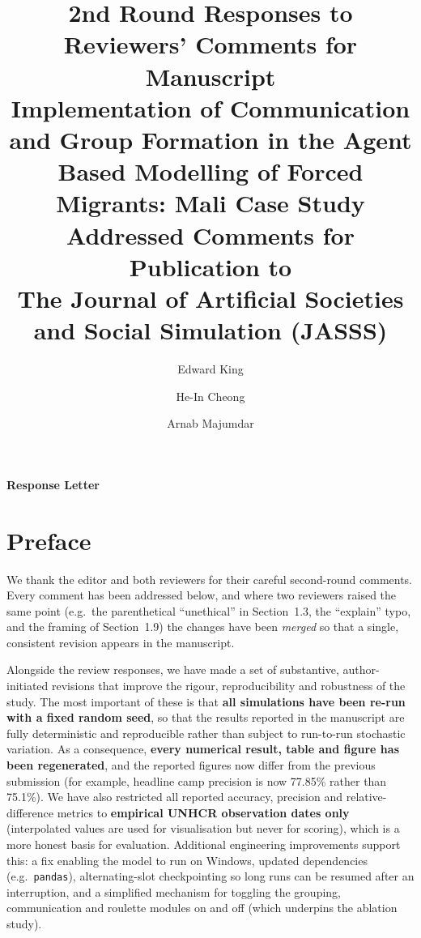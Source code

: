 \documentclass[11pt,a4paper]{article}
\title{2nd Round Responses to Reviewers’ Comments for Manuscript\\[0.8em]
\textbf{Implementation of Communication and Group Formation in the Agent Based Modelling of Forced Migrants: Mali Case Study}\\[0.8em]
Addressed Comments for Publication to\\
\textbf{The Journal of Artificial Societies and Social Simulation (JASSS)}
}
\author[1]{Edward King}
\author[1]{He-In Cheong}
\author[1]{Arnab Majumdar}
\affil[1]{Department of Civil and Environmental Engineering, Imperial College London\\
South Kensington Campus, London SW7 2AZ}
\date{}
\begin{document}

\maketitle
\vfill

\begin{center}
\textbf{Response Letter}
\end{center}

\newpage


\setcounter{page}{1}
\renewcommand{\contentsname}{Contents}
\tableofcontents

\newpage


\section*{Preface}

We thank the editor and both reviewers for their careful second-round comments. Every comment has been
addressed below, and where two reviewers raised the same point (e.g.\ the parenthetical ``unethical'' in
Section~1.3, the ``explain'' typo, and the framing of Section~1.9) the changes have been \emph{merged} so
that a single, consistent revision appears in the manuscript.

Alongside the review responses, we have made a set of substantive, author-initiated revisions that improve
the rigour, reproducibility and robustness of the study. The most important of these is that
\textbf{all simulations have been re-run with a fixed random seed}, so that the results reported in the
manuscript are fully deterministic and reproducible rather than subject to run-to-run stochastic variation.
As a consequence, \textbf{every numerical result, table and figure has been regenerated}, and the reported
figures now differ from the previous submission (for example, headline camp precision is now 77.85\%
rather than 75.1\%). We have also restricted all reported accuracy, precision and relative-difference
metrics to \textbf{empirical UNHCR observation dates only} (interpolated values are used for visualisation
but never for scoring), which is a more honest basis for evaluation. Additional engineering improvements
support this: a fix enabling the model to run on Windows, updated dependencies (e.g.\ \texttt{pandas}),
alternating-slot checkpointing so long runs can be resumed after an interruption, and a simplified mechanism
for toggling the grouping, communication and roulette modules on and off (which underpins the ablation study).
\end{document}
